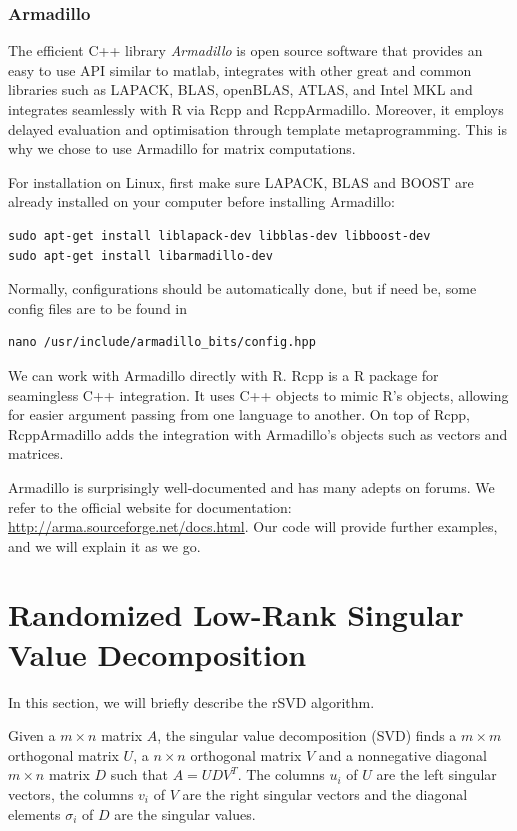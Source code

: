 \documentclass[a4paper,11pt]{amsart}
\begin{document}
\subsubsection{Armadillo}
The efficient C++ library \emph{Armadillo} is open source software that provides an easy to use API similar to matlab, integrates with other great and common libraries such as LAPACK, BLAS, openBLAS, ATLAS, and Intel MKL and integrates seamlessly with R via Rcpp and RcppArmadillo. Moreover, it employs delayed evaluation and optimisation through template metaprogramming. This is why we chose to use Armadillo for matrix computations. 

For installation on Linux, first make sure LAPACK, BLAS and BOOST are already installed on your computer before installing Armadillo:
\begin{verbatim}
sudo apt-get install liblapack-dev libblas-dev libboost-dev
sudo apt-get install libarmadillo-dev
\end{verbatim}

Normally, configurations should be automatically done, but if need be, some config files are to be found in
\begin{verbatim}
nano /usr/include/armadillo_bits/config.hpp  
\end{verbatim}

We can work with Armadillo directly with R. Rcpp is a R package for seamingless C++ integration. It uses C++ objects to mimic R's objects, allowing for easier argument passing from one language to another. On top of Rcpp, RcppArmadillo adds the integration with Armadillo's objects such as vectors and matrices. 

Armadillo is surprisingly well-documented and has many adepts on forums. We refer to the official website for documentation: \url{http://arma.sourceforge.net/docs.html}. Our code will provide further examples, and we will explain it as we go.

\section{Randomized Low-Rank Singular Value Decomposition}
In this section, we will briefly describe the rSVD algorithm.

Given a $m\times n$ matrix $A$, the singular value decomposition (SVD) finds a $m\times m$ orthogonal matrix $U$, a $n\times n$ orthogonal matrix $V$ and a nonnegative diagonal $m\times n$ matrix $D$ such that $A = UDV^T$. The columns $u_i$ of $U$ are the left singular vectors, the columns $v_i$ of $V$ are the right singular vectors and the diagonal elements $\sigma_i$ of $D$ are the singular values.
\end{document}
